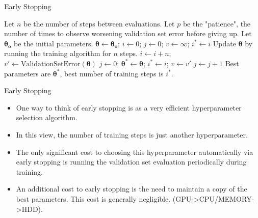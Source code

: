 \documentclass[10pt]{beamer}
\begin{document}
	\begin{frame}{Early Stopping}
		\begin{algorithm}[H]
			\caption{Early Stopping Algorithm}
			\label{alg:early-stopping}
			\begin{algorithmic}
				\pause
				\STATE Let $n$ be the number of steps between evaluations.
				\pause
				\STATE Let $p$ be the "patience", the number of times to observe worsening validation set error before giving up.
				\pause
				\STATE Let $\bm{\theta_o}$ be the initial parameters.
				\pause
				\STATE $\bm{\theta}\leftarrow\bm{\theta_o}$; $i\leftarrow0$; $j\leftarrow0$; $v\leftarrow\infty$; $i^*\leftarrow i$
				\pause
					\pause
					\STATE Update $\bm{\theta}$ by running the training algorithm for $n$ steps.
					\pause
					\STATE $i\leftarrow i+n$; $v'\leftarrow\text{ValidationSetError}(\bm{\theta})$
					\pause
						\pause
						\STATE $j\leftarrow0$; $\bm{\theta^*\leftarrow\bm{\theta}}$; $i^*\leftarrow i$; $v\leftarrow v'$
					\ELSE
						\pause
						\STATE $j\leftarrow j+1$
					\ENDIF
				\ENDWHILE
				\pause
				\STATE Best parameters are $\bm{\theta^*}$, best number of training steps is $i^*$.
			\end{algorithmic}
		\end{algorithm}
	\end{frame}

	\begin{frame}{Early Stopping}
		\begin{itemize}
			\item One way to think of early stopping is as a very efficient hyperparameter selection algorithm.
			\pause
			\item In this view, the number of training steps is just another hyperparameter.
			\pause
			\item The only significant cost to choosing this hyperparameter automatically via early stopping is running the validation set evaluation periodically during training.
			\pause
			\item An additional cost to early stopping is the need to maintain a copy of the best parameters. This cost is generally negligible. (GPU->CPU/MEMORY->HDD).
		\end{itemize}
	\end{frame}
\end{document}
